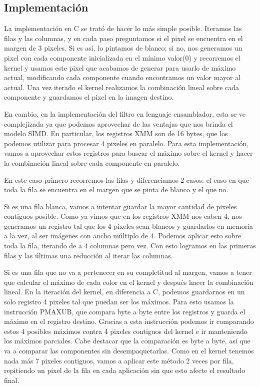 \subsection{Implementación}
 
La implementación en C se trató de hacer lo más simple posible. Iteramos las filas y las columnas, y en cada paso preguntamos si el pixel se encuentra en el margen de 3 pixeles. Si es así, lo pintamos de blanco; si no, nos generamos un pixel con cada componente inicializada en el mínimo valor(0) y recorremos el kernel y usamos este pixel que acabamos de generar para usarlo de máximo actual,  modificando cada componente cuando encontramos un valor mayor al actual. Una vez iterado el kernel realizamos la combinación lineal sobre cada componente y guardamos el pixel en la imagen destino.
 
En cambio, en la implementación del filtro en lenguaje ensamblador, esta se ve complejizada ya que podemos aprovechar de las ventajas que nos brinda el modelo SIMD. En particular, los registros XMM son de 16 bytes, que los podemos utilizar para procesar 4 pixeles en paralelo. Para esta implementación, vamos a aprovechar estos registros para buscar el máximo sobre el kernel y hacer la combinación lineal sobre cada componente en paralelo.
 
En este caso primero recorremos las filas y diferenciamos 2 casos: el caso en que toda la fila se encuentra en el margen que se pinta de blanco y el que no.
 
Si es una fila blanca, vamos a intentar guardar la mayor cantidad de pixeles contiguos posible. Como ya vimos que en los registros XMM nos caben 4, nos generamos un registro tal que los 4 pixeles sean blancos y guardarlos en memoria a la vez, al ser imágenes con ancho múltiplo de 4. Podemos aplicar esto sobre toda la fila, iterando de a 4 columnas pero vez. Con esto logramos en las primeras filas y las últimas una reducción al iterar las columnas.
 
Si es una fila que no va a pertenecer en su completitud al margen, vamos a tener que calcular el máximo de cada color en el kernel y después hacer la combinación lineal. En la iteración del kernel, en diferencia a C, podemos guardarnos en un solo registro 4 pixeles tal que puedan ser los máximos. Para esto usamos la instrucción PMAXUB, que compara byte a byte entre los registros y guarda el máximo en el registro destino. Gracias a esta instrucción podemos ir comparando estos 4 posibles máximos contra 4 pixeles contiguos del kernel e ir manteniendo los máximos parciales. Cabe destacar que la comparación es byte a byte, así que va a comparar las componentes sin desempaquetarlas. Como en el kernel tenemos nada más 7 pixeles contiguos, vamos a aplicar este método 2 veces por fila, repitiendo un pixel de la fila en cada aplicación sin que esto afecte el resultado final.

